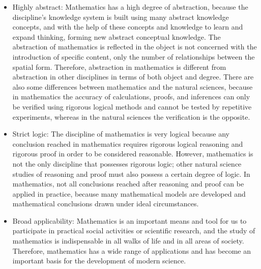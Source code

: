 \begin{itemize}
	\item Highly abstract: Mathematics has a high degree of abstraction, because the discipline's knowledge system is built using many abstract knowledge concepts, and with the help of these concepts and knowledge to learn and expand thinking, forming new abstract conceptual knowledge. The abstraction of mathematics is reflected in the object is not concerned with the introduction of specific content, only the number of relationships between the spatial form. Therefore, abstraction in mathematics is different from abstraction in other disciplines in terms of both object and degree. There are also some differences between mathematics and the natural sciences, because in mathematics the accuracy of calculations, proofs, and inferences can only be verified using rigorous logical methods and cannot be tested by repetitive experiments, whereas in the natural sciences the verification is the opposite.
	\item Strict logic: The discipline of mathematics is very logical because any conclusion reached in mathematics requires rigorous logical reasoning and rigorous proof in order to be considered reasonable. However, mathematics is not the only discipline that possesses rigorous logic; other natural science studies of reasoning and proof must also possess a certain degree of logic. In mathematics, not all conclusions reached after reasoning and proof can be applied in practice, because many mathematical models are developed and mathematical conclusions drawn under ideal circumstances.
	\item Broad applicability: Mathematics is an important means and tool for us to participate in practical social activities or scientific research, and the study of mathematics is indispensable in all walks of life and in all areas of society. Therefore, mathematics has a wide range of applications and has become an important basis for the development of modern science.
\end{itemize}

